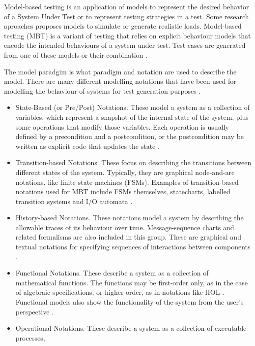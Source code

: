 \documentclass{report}
\begin{document}
Model-based testing is an application  of models to represent the desired behavior of a System Under Test or to represent testing strategies in a test. Some research aproaches proposes models to simulate or  generate realistic loads. Model-based testing (MBT) is a variant of testing that relies on explicit behaviour models that encode the intended behaviours of a system under test. Test cases are generated from one of these models or their combination \cite{MarkUtting2012} \cite{Bertolino2008}.

The model paradgim is what paradigm and notation are used to describe the model. There are many different modelling notations that have been used for modelling the behaviour of systems for test generation purposes \cite{MarkUtting2012} \cite{Hierons2009}.

\begin{itemize}
\item State-Based (or Pre/Post) Notations. These model a system as a collection of variables, which represent a snapshot of the internal state of the system, plus some operations that modify those variables. Each operation is usually defined by a precondition and a postcondition, or the postcondition may be written as explicit code that updates the state \cite{MarkUtting2012}.
\item Transition-based Notations. These focus on describing the transitions between different states
of the system. Typically, they are graphical node-and-arc notations, like finite state machines
(FSMs). Examples of transition-based notations used for MBT include FSMs themselves, statecharts, labelled transition systems and I/O automata \cite{MarkUtting2012}.
\item History-based Notations. These notations model a system by describing the allowable traces
of its behaviour over time. Message-sequence charts and related formalisms are also included in this group. These are
graphical and textual notations for specifying sequences of interactions between components \cite{MarkUtting2012}.
\item Functional Notations. These describe a system as a collection of mathematical functions. The
functions may be first-order only, as in the case of algebraic specifications, or higher-order, as in
notations like HOL \cite{MarkUtting2012}. Functional models also show the functionality of the system from the user’s perspective \cite{Ye2007}.
\item Operational Notations. These describe a system as a collection of executable processes,

\end{itemize}
\end{document}

